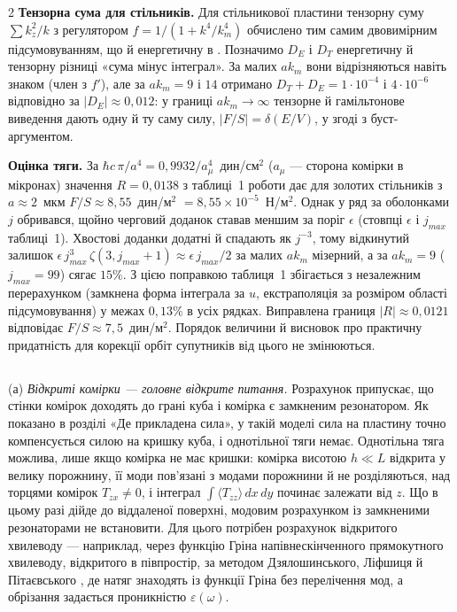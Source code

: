 \documentclass[twoside, 10pt]{article}
\def\myvspacebeforesubsection{-2.0mm}
\def\myvspaceaftersubsection{-2.5mm}
\begin{document}
\begin{multicols}{2}
\textbf{Тензорна сума для стільників.} Для стільникової пластини тензорну суму \(\sum k_z^2/k\) з
регулятором \(f=1/(1+k^4/k_m^4)\) обчислено тим самим двовимірним підсумовуванням, що й
енергетичну в \cite{Drozdov2024}. Позначимо \(D_E\) і \(D_T\) енергетичну й тензорну різниці «сума
мінус інтеграл». За малих \(ak_m\) вони відрізняються навіть знаком (член з \(f'\)), але за
\(ak_m=9\) і \(14\) отримано \(D_T+D_E=1\cdot10^{-4}\) і \(4\cdot10^{-6}\) відповідно за
\(|D_E|\approx0{,}012\): у границі \(ak_m\to\infty\) тензорне й гамільтонове виведення дають одну й
ту саму силу, \(|F/S|=\delta(E/V)\), у згоді з буст-аргументом.

\textbf{Оцінка тяги.} За \(\hbar c\,\pi/a^4=0{,}9932/a_\mu^4\)~дин/см\(^2\) (\(a_\mu\) --- сторона
комірки в мікронах) значення \(R=0{,}0138\) з таблиці~1 роботи \cite{Drozdov2024} дає для золотих
стільників з \(a\approx2\)~мкм \(F/S\approx8{,}55\)~дин/м\(^2\) \(=8{,}55\times10^{-5}\)~Н/м\(^2\).
Однак у \cite{Drozdov2024} ряд за оболонками \(j\) обривався, щойно черговий доданок ставав меншим
за поріг \(\epsilon\) (стовпці \(\epsilon\) і \(j_{max}\) таблиці~1). Хвостові доданки додатні й
спадають як \(j^{-3}\), тому відкинутий залишок
\(\epsilon\,j_{max}^3\,\zeta(3,j_{max}+1)\approx\epsilon\,j_{max}/2\) за малих \(ak_m\) мізерний,
а за \(ak_m=9\) (\(j_{max}=99\)) сягає \(15\%\). З цією поправкою таблиця~1 збігається з незалежним
перерахунком (замкнена форма інтеграла за \(u\), екстраполяція за розміром області підсумовування)
у межах \(0{,}13\%\) в усіх рядках. Виправлена границя \(|R|\approx0{,}0121\) відповідає
\(F/S\approx7{,}5\)~дин/м\(^2\). Порядок величини й висновок про практичну придатність для корекції
орбіт супутників від цього не змінюються.

\vspace{\myvspacebeforesubsection}
\subsection*{}
\vspace{\myvspaceaftersubsection}


(а) \textit{Відкриті комірки --- головне відкрите питання.} Розрахунок припускає, що стінки комірок доходять до грані куба і комірка є замкненим резонатором. Як показано в розділі «Де прикладена сила», у такій моделі сила на пластину точно компенсується силою на кришку куба, і однотільної тяги немає. Однотільна тяга можлива, лише якщо комірка не має кришки: комірка висотою \(h\ll L\) відкрита у велику порожнину, її моди пов'язані з модами порожнини й не розділяються, над торцями комірок \(T_{zx}\neq0\), і інтеграл \(\int\langle T_{zz}\rangle\,dx\,dy\) починає залежати від \(z\). Що в цьому разі дійде до віддаленої поверхні, модовим розрахунком із замкненими резонаторами не встановити. Для цього потрібен розрахунок відкритого хвилеводу --- наприклад, через функцію Гріна напівнескінченного прямокутного хвилеводу, відкритого в півпростір, за методом Дзялошинського, Ліфшиця й Пітаєвського \cite{DLP1961}, де натяг знаходять із функції Гріна без перелічення мод, а обрізання задається проникністю \(\varepsilon(\omega)\).


\end{multicols}
\end{document}
